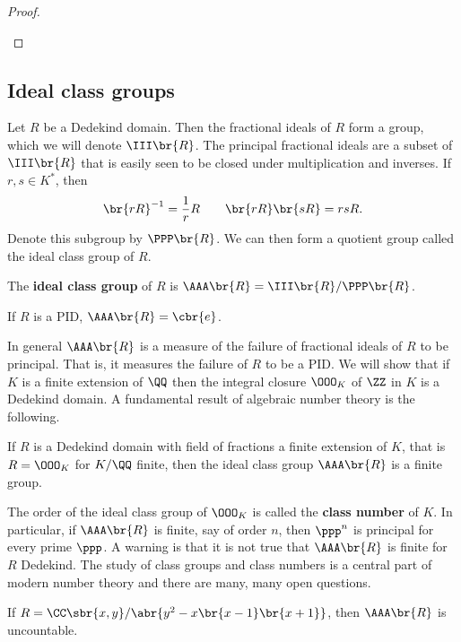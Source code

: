 \begin{proof}
\begin{itemize}
\end{itemize}
\end{proof}

\subsection{Ideal class groups}

Let $ R $ be a Dedekind domain. Then the fractional ideals of $ R $ form a group, which we will denote $ \III\br{R} $. The principal fractional ideals are a subset of $ \III\br{R} $ that is easily seen to be closed under multiplication and inverses. If $ r, s \in K^* $, then
$$ \br{rR}^{-1} = \dfrac{1}{r}R \qquad \br{rR}\br{sR} = rsR. $$
Denote this subgroup by $ \PPP\br{R} $. We can then form a quotient group called the ideal class group of $ R $.

\begin{definition}
The \textbf{ideal class group} of $ R $ is $ \AAA\br{R} = \III\br{R} / \PPP\br{R} $.
\end{definition}

\begin{example*}
If $ R $ is a PID, $ \AAA\br{R} = \cbr{e} $.
\end{example*}

In general $ \AAA\br{R} $ is a measure of the failure of fractional ideals of $ R $ to be principal. That is, it measures the failure of $ R $ to be a PID. We will show that if $ K $ is a finite extension of $ \QQ $ then the integral closure $ \OOO_K $ of $ \ZZ $ in $ K $ is a Dedekind domain. A fundamental result of algebraic number theory is the following.

\begin{theorem}
If $ R $ is a Dedekind domain with field of fractions a finite extension of $ K $, that is $ R = \OOO_K $ for $ K / \QQ $ finite, then the ideal class group $ \AAA\br{R} $ is a finite group.
\end{theorem}

The order of the ideal class group of $ \OOO_K $ is called the \textbf{class number} of $ K $. In particular, if $ \AAA\br{R} $ is finite, say of order $ n $, then $ \ppp^n $ is principal for every prime $ \ppp $. A warning is that it is not true that $ \AAA\br{R} $ is finite for $ R $ Dedekind. The study of class groups and class numbers is a central part of modern number theory and there are many, many open questions.

\begin{example*}
If $ R = \CC\sbr{x, y} / \abr{y^2 - x\br{x - 1}\br{x + 1}} $, then $ \AAA\br{R} $ is uncountable.
\end{example*}

